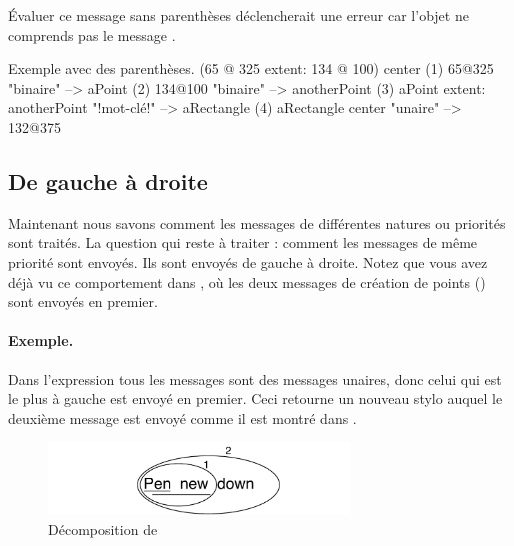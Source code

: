 \documentclass[a4paper,10pt,twoside]{book}
\begin{document}
\'Evaluer ce message sans parenth\`eses d\'eclencherait une erreur car l'objet  ne comprends pas le message .

\begin{example}[decExtent]{Exemple avec des parenth\`eses.}{}
      (65 @ 325 extent: 134 @ 100) center
(1)   65@325                                                    "binaire"
    --> aPoint
(2)                                134@100                     "binaire"
                                 --> anotherPoint
(3)   aPoint extent: anotherPoint                       "!mot-cl\'e!"
      --> aRectangle
(4)   aRectangle center                                     "unaire"
      --> 132@375
\end{example}

\subsection{De gauche \`a droite}
Maintenant nous savons comment les messages de diff\'erentes natures ou priorit\'es sont trait\'es. La question qui reste \`a traiter : comment les messages de m\^eme priorit\'e sont envoy\'es. Ils sont envoy\'es de gauche \`a droite. Notez que vous avez d\'ej\`a vu ce comportement dans , o\`u les deux messages de cr\'eation de points () sont envoy\'es en premier.



\paragraph{Exemple.} Dans l'expression  tous les messages sont des messages unaires, donc celui qui est le plus \`a gauche  est envoy\'e en premier. Ceci retourne un nouveau stylo auquel le deuxi\`eme message  est envoy\'e  comme il est montr\'e dans .

\begin{figure}
	\centering
	\includegraphics[width=8cm]{ucompoUn}
	\caption{D\'ecomposition de \label{fig:unaryMessages}}
\end{figure}
\end{document}
